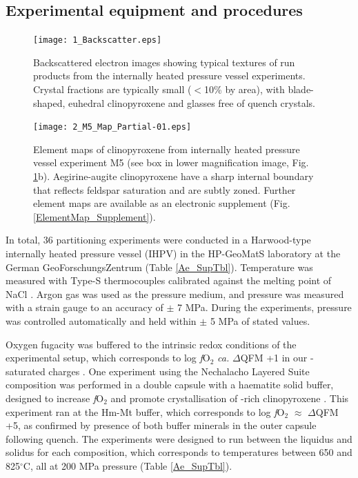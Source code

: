 \documentclass[review,authoryear,12pt]{elsarticle}
\newcommand{\dgC}{$^\circ$C }
\newcommand{\dgCs}{$^\circ$C}
\newcommand{\fO}{\textit{f}O$_{2}$ }
\begin{document}
\subsection{Experimental equipment and procedures}

        \begin{figure}[ht]
        \begin{center}
        \texttt{[image: 1\_Backscatter.eps]}
       	\caption[Backscattered electron images showing typical textures of run products from the internally heated pressure vessel experiments]{Backscattered electron images showing typical textures of run products from the internally heated pressure vessel experiments. Crystal fractions are typically small ($<$10\% by area), with blade-shaped, euhedral clinopyroxene and glasses free of quench crystals.}
        \label{1_BSE}
        \end{center}
        \end{figure}
        
        
        \begin{figure}[ht]
        \begin{center}
        \texttt{[image: 2\_M5\_Map\_Partial-01.eps]}
        \caption[Element maps of a clinopyroxene from internally heated pressure vessel experiment M5]{Element maps of clinopyroxene from internally heated pressure vessel experiment M5 (see box in lower magnification image, Fig. \ref{1_BSE}b). Aegirine-augite clinopyroxene have a sharp internal boundary that reflects feldspar saturation and are subtly zoned. Further element maps are available as an electronic supplement (Fig. \ref{ElementMap_Supplement}).}
        \label{2_Elementmap}
        \end{center}
        \end{figure}

In total, 36 partitioning experiments were conducted in a Harwood-type internally heated pressure vessel (IHPV) in the HP-GeoMatS laboratory at the German GeoForschungsZentrum (Table \ref{Ae_SupTbl}). Temperature was measured with Type-S thermocouples calibrated against the melting point of NaCl \citep[][accuracy of $\pm$ 5 \dgC at 200 MPa]{Borchert2010}. Argon gas was used as the pressure medium, and pressure was measured with a strain gauge to an accuracy of $\pm$ 7 MPa. During the experiments, pressure was controlled automatically and held within $\pm$ 5 MPa of stated values. 

Oxygen fugacity was buffered to the intrinsic redox conditions of the experimental setup, which corresponds to log \fO \emph{ca.} $\Delta$QFM +1 in our -saturated charges \cite[see][]{Chou1986,Berndt2002, Jugo2010}. One experiment using the Nechalacho Layered Suite composition was performed in a double capsule with a haematite solid buffer, designed to increase \fO and promote crystallisation of -rich clinopyroxene \citep{Eugster1962}. This experiment ran at the Hm-Mt buffer, which corresponds to log \fO $\approx$ $\Delta$QFM +5, as confirmed by presence of both buffer minerals in the outer capsule following quench. The experiments were designed to run between the liquidus and solidus for each composition, which corresponds to temperatures between 650 and 825\dgCs, all at 200 MPa pressure (Table \ref{Ae_SupTbl}).
\end{document}
